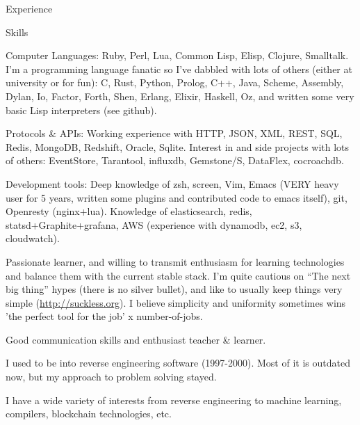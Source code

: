 \documentclass{resume} %
\begin{document}
\begin{rSection}{Experience}

\end{rSection}


\begin{rSection}{Skills}

\item Computer Languages: Ruby, Perl, Lua, Common Lisp, Elisp,
  Clojure, Smalltalk.  I'm a programming language fanatic so I've
  dabbled with lots of others (either at university or for fun):
  C, Rust, Python, Prolog, C++, Java, Scheme, Assembly, Dylan, Io, Factor,
  Forth, Shen, Erlang, Elixir, Haskell, Oz, and written some very
  basic Lisp interpreters (see github).

\item Protocols \& APIs: Working experience with HTTP, JSON, XML,
  REST, SQL, Redis, MongoDB, Redshift, Oracle, Sqlite. Interest in and
  side projects with lots of others: EventStore, Tarantool, influxdb,
  Gemstone/S, DataFlex, cocroachdb.

\item Development tools: Deep knowledge of zsh, screen, Vim, Emacs
  (VERY heavy user for 5 years, written some plugins and contributed
  code to emacs itself), git, Openresty (nginx+lua). Knowledge of
  elasticsearch, redis, statsd+Graphite+grafana, AWS (experience with
  dynamodb, ec2, s3, cloudwatch).

\item Passionate learner, and willing to transmit enthusiasm for
  learning technologies and balance them with the current stable
  stack. I'm quite cautious on ``The next big thing'' hypes (there is
  no silver bullet), and like to usually keep things very simple
  (\url{http://suckless.org}). I believe simplicity and uniformity
  sometimes wins 'the perfect tool for the job' x number-of-jobs.

\item Good communication skills and enthusiast teacher \& learner.

\item I used to be into reverse engineering software (1997-2000). Most
  of it is outdated now, but my approach to problem solving stayed.

\item I have a wide variety of interests from reverse engineering to
  machine learning, compilers, blockchain technologies, etc.

\end{rSection}
\end{document}
